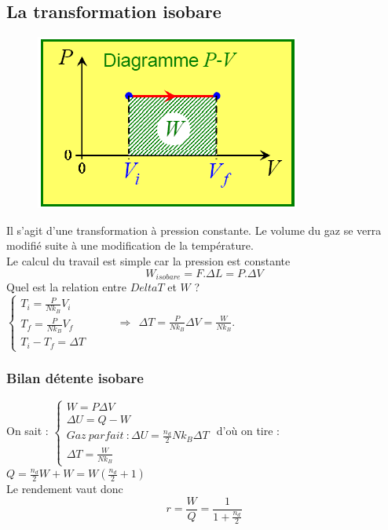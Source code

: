 \documentclass	[11pt, a4paper, openany]{book}
\begin{document}
\subsection{La transformation isobare}
\begin{figure}
	\includegraphics[scale=0.34]{th/image10.png}
\end{figure}
Il s'agit d'une transformation à pression constante. Le volume du gaz se verra modifié suite à une modification de la température. \\
Le calcul du travail est simple car la pression est constante 
\begin{equation}
	W_{isobare} = F.\Delta L = P. \Delta V
\end{equation}
Quel est la relation entre $Delta T$ et $W$ ?\\
$\left\{\begin{array}{l}
T_i =  \frac{P}{Nk_B}V_i\\
T_f = \frac{P}{Nk_B}V_f\\
T_i - T_f = \Delta T
\end{array}\right.$\ \ \ \ \ $\Rightarrow\ \ \Delta T = \frac{P}{Nk_B}\Delta V = \frac{W}{Nk_B}$.

\subsubsection{Bilan détente isobare}
On sait : $\left\{\begin{array}{l}
W = P\Delta V\\
\Delta U = Q - W\\
Gaz\ parfait\ : \Delta U = \frac{n_d}{2}Nk_B\Delta T\\
\Delta T = \frac{W}{Nk_B}
\end{array}\right.$ d'où on tire : $Q = \frac{n_d}{2}W + W = W(\frac{n_d}{2}+1)$\\
Le rendement vaut donc 
\begin{equation}
	r = \frac{W}{Q} = \frac{1}{1 + \frac{n_d}{2}}
\end{equation}
\end{document}
